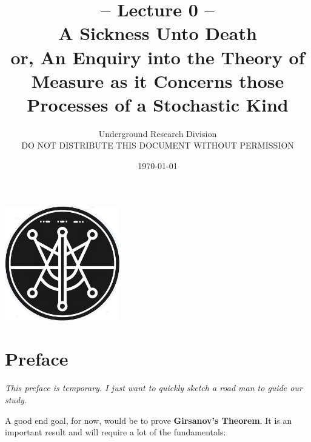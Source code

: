 \documentclass[reqno,a4paper,12pt]{amsart}%
\numberwithin{equation}{section}
\theoremstyle{definition}
\begin{document}
	\title[A Sickness Unto Death]{-- Lecture  0 -- \\
	\Large A Sickness Unto Death \\
	\small or, An Enquiry into the Theory of Measure as it Concerns those Processes of a Stochastic Kind
	}
	\author[Underground Research Division]{Underground Research Division
	\\ 
	DO NOT DISTRIBUTE THIS DOCUMENT WITHOUT PERMISSION }
	\date{\today}
	\maketitle
	
	\begin{center}
		\includegraphics[width=5cm, height=5cm]{urd.jpg}
	 \end{center}
	
\pagebreak

\iffalse  
  \section*{Preface}

\textit{This preface is temporary. I just want to quickly sketch a road man to guide our study.}

\smallbreak

A good end goal, for now, would be to prove \textbf{Girsanov's Theorem}. It is an important result and will require a lot of the fundamentals:

\smallbreak
\end{document}
